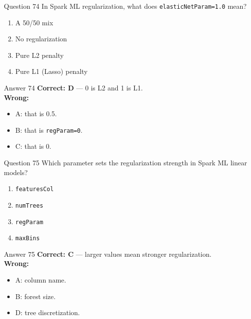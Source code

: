 \documentclass[aspectratio=169,11pt]{beamer}
\begin{document}
\begin{frame}{Question 74}
In Spark ML regularization, what does \texttt{elasticNetParam=1.0} mean?
\begin{enumerate}[label=\Alph*.]
\item A 50/50 mix
\item No regularization
\item Pure L2 penalty
\item Pure L1 (Lasso) penalty
\end{enumerate}
\end{frame}
\begin{frame}{Answer 74}
\textbf{Correct: D} --- 0 is L2 and 1 is L1.\\
\vspace{0.5em}
\textbf{Wrong:}
\begin{itemize}
\item A: that is 0.5.
\item B: that is \texttt{regParam=0}.
\item C: that is 0.
\end{itemize}
\end{frame}

\begin{frame}{Question 75}
Which parameter sets the regularization strength in Spark ML linear models?
\begin{enumerate}[label=\Alph*.]
\item \texttt{featuresCol}
\item \texttt{numTrees}
\item \texttt{regParam}
\item \texttt{maxBins}
\end{enumerate}
\end{frame}
\begin{frame}{Answer 75}
\textbf{Correct: C} --- larger values mean stronger regularization.\\
\vspace{0.5em}
\textbf{Wrong:}
\begin{itemize}
\item A: column name.
\item B: forest size.
\item D: tree discretization.
\end{itemize}
\end{frame}
\end{document}
